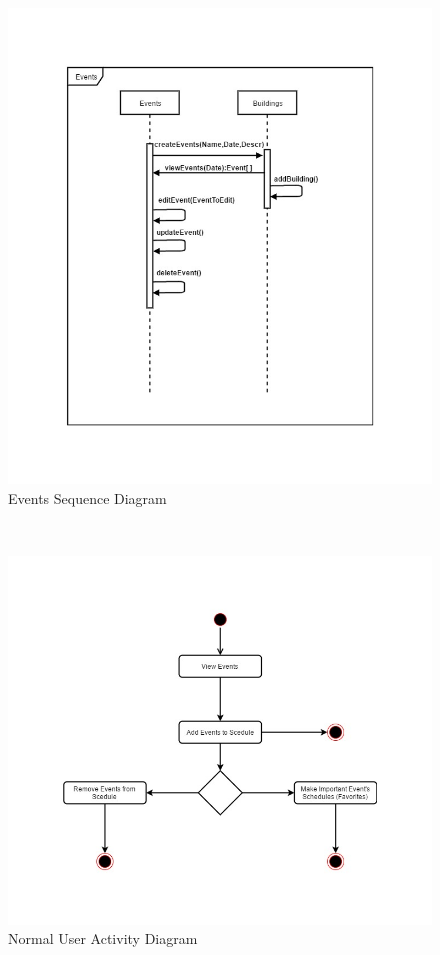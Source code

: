 \documentclass{article}
\begin{document}
    \mbox{}\\
    \bigskip
  
    
    \begin{figure}[h!]
        \includegraphics[width=\textwidth]{EventsSequence.jpg} \caption{Events Sequence Diagram}
    \end{figure}
  
    
    \mbox{}\\
    \bigskip
    
    
    \begin{figure}[h!]
        \includegraphics[width=\textwidth]{ActivityDiagramUser.jpg} \caption{Normal User Activity Diagram}
    \end{figure}
    
\end{document}
